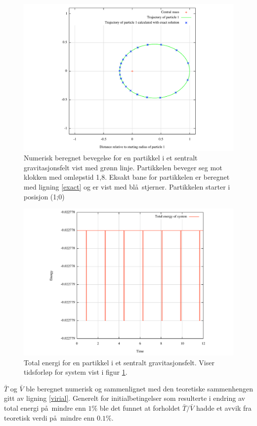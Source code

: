 \documentclass[5p]{elsarticle}        %
\begin{document}
\begin{figure}[t] 
	\begin{center}
		\includegraphics[width=.55\textwidth,center]{one_particle_position.pdf} 
	\end{center}
		\caption{Numerisk beregnet bevegelse for en partikkel i et sentralt gravitasjonsfelt vist med gr\o nn linje. Partikkelen beveger seg mot klokken med oml\o pstid 1,8. Eksakt bane for partikkelen er beregnet med ligning \eqref{exact} og er vist med bl\aa \ stjerner. Partikkelen starter i posisjon (1;0)} 
		\label{1pos} %
\end{figure}
\begin{figure}[b] 
	\begin{center}
		\includegraphics[width=.55\textwidth,center]{one_particle_energy.pdf} 
	\end{center}
		\caption{Total energi for en partikkel i et sentralt gravitasjonsfelt. Viser tidsforl\o p for system vist i figur \ref{1pos}.} 
		\label{1energi} %
\end{figure}
$\bar{T}$ og $\bar{V}$ ble beregnet numerisk og sammenlignet med den teoretiske sammenhengen gitt av ligning \eqref{virial}. Generelt for initialbetingelser som resulterte i endring av total energi p\aa \ mindre enn $1\%$ ble det funnet at forholdet $\bar{T}/\bar{V}$ hadde et avvik fra teoretisk verdi p\aa \ mindre enn $0.1\%$.
\end{document}
